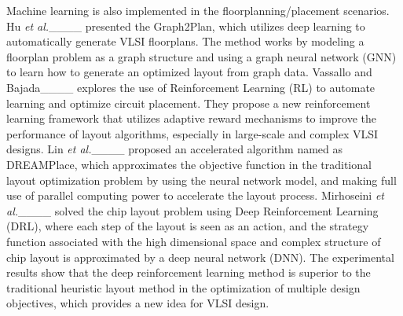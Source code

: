  Machine learning is also implemented in the floorplanning/placement scenarios. Hu \emph{et al.}____ presented the Graph2Plan, which utilizes deep learning to automatically generate VLSI floorplans. The method works by modeling a floorplan problem as a graph structure and using a graph neural network (GNN) to learn how to generate an optimized layout from graph data. Vassallo and Bajada____ explores the use of Reinforcement Learning (RL) to automate learning and optimize circuit placement. They propose a new reinforcement learning framework that utilizes adaptive reward mechanisms to improve the performance of layout algorithms, especially in large-scale and complex VLSI designs. Lin \emph{et al.}____ proposed an accelerated algorithm named as  DREAMPlace, which approximates the objective function in the traditional layout optimization problem by using the neural network model, and making full use of parallel computing power to accelerate the layout process. Mirhoseini \emph{et al.}____ solved the chip layout problem using Deep Reinforcement Learning (DRL), where each step of the layout is seen as an action, and the strategy function associated with the high dimensional space and complex structure of chip layout is approximated by a deep neural network (DNN). The experimental results show that the deep reinforcement learning method is superior to the traditional heuristic layout method in the optimization of multiple design objectives, which provides a new idea for VLSI design.





